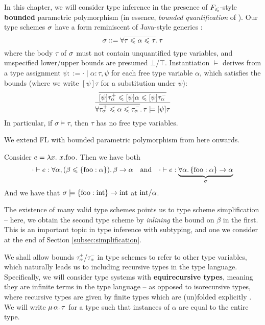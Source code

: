 In this chapter, we will consider type inference in the presence of $F_\leqslant$-style \textbf{bounded} parametric polymorphism (in essence, \emph{bounded quantification} of \textcite{bounded-quantification}). Our type schemes $\sigma$ have a form reminiscent of Java-style generics \cite{generic-java, simple-sub}:
$$ \sigma ::= \forall \overline{\tau \leqslant \alpha \leqslant \tau} \ldotp \tau $$
where the body $\tau$ of $\sigma$ must not contain unquantified type variables, and unspecified lower/upper bounds are presumed $\bot$/$\top$. 
Instantiation $\models$ derives from a type assignment $\psi ::= \cdot \mid \alpha : \tau, \psi$ for each free type variable $\alpha$, which satisfies the bounds (where we write $[\psi]\tau$ for a substitution under $\psi$):
$$ \dfrac{\overline{[\psi]\tau_\alpha^+ \sub \substx{\psi} \alpha \sub [\psi]\tau_\alpha^-}}{\forall \overline{\tau_\alpha^+ \sub \alpha \sub \tau_\alpha^-} \ldotp \tau \models \substx{\psi}{\tau}} $$
In particular, if $\sigma \models \tau$, then $\tau$ has no free type variables.

\begin{example}
    We extend FL with bounded parametric polymorphism from here onwards. 

    Consider $e = \lambda {x} \ldotp\, {x}{.}{\mathrm{foo}}$. Then we have both 
    $$ \cdot \vdash e : \forall \alpha, (\beta \sub \flrec{\mathrm{foo} : \alpha}) \ldotp \beta \to \alpha  \quad \text{and} \quad \cdot \vdash e : \underbrace{\forall  \alpha \ldotp \flrec{\mathrm{foo} : \alpha} \to \alpha}_\sigma $$
    And we have that $\sigma \models \flrec{\mathrm{foo} : \sint} \to \sint$ at $\mathrm{int}/\alpha$.
    
    The existence of many valid type schemes points us to type scheme simplification -- here, we obtain the second type scheme by \emph{inlining} the bound on $\beta$ in the first. This is an important topic in type inference with subtyping, and one we consider at the end of Section \ref{subsec:simplification}.
\end{example}

We shall allow bounds $\tau_\alpha^+$/$\tau_\alpha^-$ in type schemes to refer to other type variables, which naturally leads us to including recursive types in the type language.
Specifically, we will consider type systems with \textbf{equirecursive types}, meaning they are infinite terms in the type language -- as opposed to isorecursive types, where recursive types are given by finite types which are (un)folded explicitly \cite{tapl}. We will write $\mu\,{\alpha}\ldotp \tau$ for a type  such that instances of $\alpha$ are equal to the entire type.

